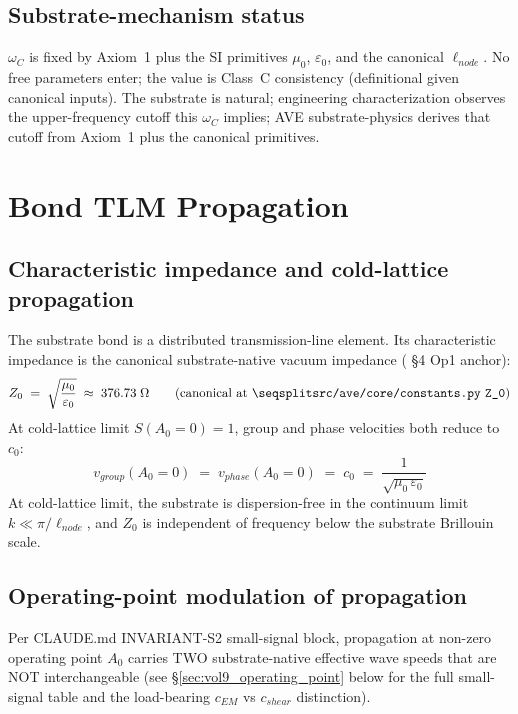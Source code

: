 \subsection{Substrate-mechanism status}

$\omega_C$ is fixed by Axiom~1 plus the SI primitives $\mu_0$, $\varepsilon_0$, and the canonical $\ell_{node}$. No free parameters enter; the value is Class~C consistency (definitional given canonical inputs). The substrate is natural; engineering characterization observes the upper-frequency cutoff this $\omega_C$ implies; AVE substrate-physics derives that cutoff from Axiom~1 plus the canonical primitives.

\section{Bond TLM Propagation}
\label{sec:vol9_tlm_propagation}

\subsection{Characteristic impedance and cold-lattice propagation}

The substrate bond is a distributed transmission-line element. Its characteristic impedance is the canonical substrate-native vacuum impedance ( \S 4 Op1 anchor):
\begin{equation}
Z_0 \;=\; \sqrt{\frac{\mu_0}{\varepsilon_0}} \;\approx\; 376.73\;\Omega \qquad \text{(canonical at \kbleaf{src/ave/core/constants.py} \texttt{Z\_0})}
\end{equation}
At cold-lattice limit $S(A_0 = 0) = 1$, group and phase velocities both reduce to $c_0$:
\begin{equation}
v_{group}(A_0 = 0) \;=\; v_{phase}(A_0 = 0) \;=\; c_0 \;=\; \frac{1}{\sqrt{\mu_0\,\varepsilon_0}}
\end{equation}
At cold-lattice limit, the substrate is dispersion-free in the continuum limit $k \ll \pi/\ell_{node}$, and $Z_0$ is independent of frequency below the substrate Brillouin scale.

\subsection{Operating-point modulation of propagation}

Per CLAUDE.md INVARIANT-S2 small-signal block, propagation at non-zero operating point $A_0$ carries TWO substrate-native effective wave speeds that are NOT interchangeable (see \S\ref{sec:vol9_operating_point} below for the full small-signal table and the load-bearing $c_{EM}$ vs $c_{shear}$ distinction).

